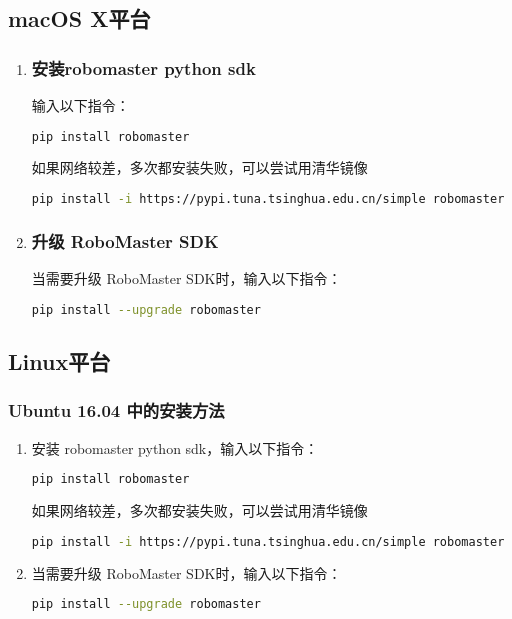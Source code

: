 \subsection{macOS X平台}\label{sub_PyRM1_2}
\begin{enumerate}
\item \subsubsection{安装robomaster python sdk}

输入以下指令：

\begin{lstlisting}[language=bash]
pip install robomaster
\end{lstlisting}

如果网络较差，多次都安装失败，可以尝试用清华镜像

\begin{lstlisting}[language=bash]
pip install -i https://pypi.tuna.tsinghua.edu.cn/simple robomaster
\end{lstlisting}

\item \subsubsection{升级 RoboMaster SDK}
当需要升级 RoboMaster SDK时，输入以下指令：

\begin{lstlisting}[language=bash]
pip install --upgrade robomaster
\end{lstlisting}

\end{enumerate}

\subsection{Linux平台}\label{sub_PyRM1_3}
\subsubsection{Ubuntu 16.04 中的安装方法}
\begin{enumerate}
\item 安装 robomaster python sdk，输入以下指令：

\begin{lstlisting}[language=bash]
pip install robomaster
\end{lstlisting}

如果网络较差，多次都安装失败，可以尝试用清华镜像

\begin{lstlisting}[language=bash]
pip install -i https://pypi.tuna.tsinghua.edu.cn/simple robomaster
\end{lstlisting}

\item 当需要升级 RoboMaster SDK时，输入以下指令：

\begin{lstlisting}[language=bash]
pip install --upgrade robomaster
\end{lstlisting}

\end{enumerate}
